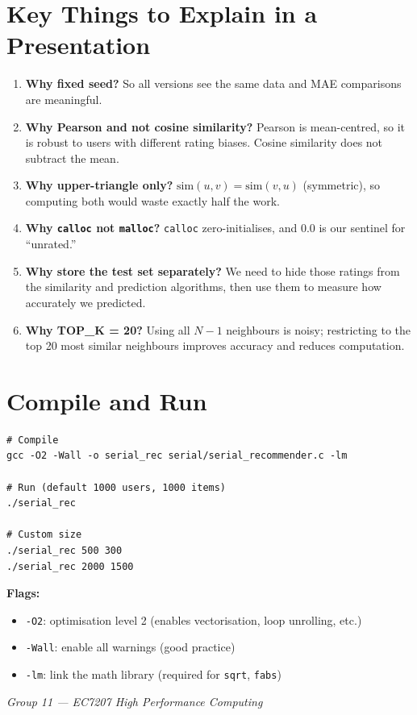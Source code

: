 \documentclass[12pt,a4paper]{article}
\begin{document}
\section{Key Things to Explain in a Presentation}

\begin{enumerate}
    \item \textbf{Why fixed seed?}  So all versions see the same data and MAE
          comparisons are meaningful.
    \item \textbf{Why Pearson and not cosine similarity?}  Pearson is
          mean-centred, so it is robust to users with different rating biases.
          Cosine similarity does not subtract the mean.
    \item \textbf{Why upper-triangle only?}  $\text{sim}(u,v) = \text{sim}(v,u)$
          (symmetric), so computing both would waste exactly half the work.
    \item \textbf{Why \texttt{calloc} not \texttt{malloc}?}  \texttt{calloc}
          zero-initialises, and $0.0$ is our sentinel for ``unrated.''
    \item \textbf{Why store the test set separately?}  We need to hide those
          ratings from the similarity and prediction algorithms, then use them
          to measure how accurately we predicted.
    \item \textbf{Why TOP\_K = 20?}  Using all $N-1$ neighbours is noisy;
          restricting to the top 20 most similar neighbours improves accuracy
          and reduces computation.
\end{enumerate}

\section{Compile and Run}

\begin{verbatim}
# Compile
gcc -O2 -Wall -o serial_rec serial/serial_recommender.c -lm

# Run (default 1000 users, 1000 items)
./serial_rec

# Custom size
./serial_rec 500 300
./serial_rec 2000 1500
\end{verbatim}

\textbf{Flags:}
\begin{itemize}
    \item \texttt{-O2}: optimisation level 2 (enables vectorisation, loop unrolling, etc.)
    \item \texttt{-Wall}: enable all warnings (good practice)
    \item \texttt{-lm}: link the math library (required for \texttt{sqrt}, \texttt{fabs})
\end{itemize}

\vfill
\begin{center}
    \small\textit{Group 11 — EC7207 High Performance Computing}
\end{center}
\end{document}
